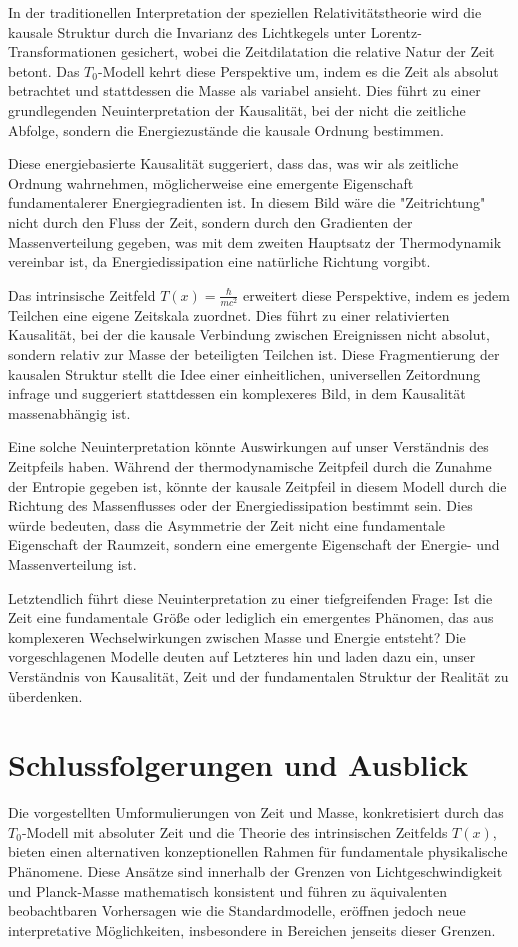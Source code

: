 \documentclass[a4paper,12pt]{article}
\newcommand{\Tfield}{T(x)}
\begin{document}
	In der traditionellen Interpretation der speziellen Relativitätstheorie wird die kausale Struktur durch die Invarianz des Lichtkegels unter Lorentz-Transformationen gesichert, wobei die Zeitdilatation die relative Natur der Zeit betont. Das \( T_0 \)-Modell kehrt diese Perspektive um, indem es die Zeit als absolut betrachtet und stattdessen die Masse als variabel ansieht. Dies führt zu einer grundlegenden Neuinterpretation der Kausalität, bei der nicht die zeitliche Abfolge, sondern die Energiezustände die kausale Ordnung bestimmen.
	
	Diese energiebasierte Kausalität suggeriert, dass das, was wir als zeitliche Ordnung wahrnehmen, möglicherweise eine emergente Eigenschaft fundamentalerer Energiegradienten ist. In diesem Bild wäre die "Zeitrichtung" nicht durch den Fluss der Zeit, sondern durch den Gradienten der Massenverteilung gegeben, was mit dem zweiten Hauptsatz der Thermodynamik vereinbar ist, da Energiedissipation eine natürliche Richtung vorgibt.
	
	Das intrinsische Zeitfeld \(\Tfield = \frac{\hbar}{m c^2}\) erweitert diese Perspektive, indem es jedem Teilchen eine eigene Zeitskala zuordnet. Dies führt zu einer relativierten Kausalität, bei der die kausale Verbindung zwischen Ereignissen nicht absolut, sondern relativ zur Masse der beteiligten Teilchen ist. Diese Fragmentierung der kausalen Struktur stellt die Idee einer einheitlichen, universellen Zeitordnung infrage und suggeriert stattdessen ein komplexeres Bild, in dem Kausalität massenabhängig ist.
	
	Eine solche Neuinterpretation könnte Auswirkungen auf unser Verständnis des Zeitpfeils haben. Während der thermodynamische Zeitpfeil durch die Zunahme der Entropie gegeben ist, könnte der kausale Zeitpfeil in diesem Modell durch die Richtung des Massenflusses oder der Energiedissipation bestimmt sein. Dies würde bedeuten, dass die Asymmetrie der Zeit nicht eine fundamentale Eigenschaft der Raumzeit, sondern eine emergente Eigenschaft der Energie- und Massenverteilung ist.
	
	Letztendlich führt diese Neuinterpretation zu einer tiefgreifenden Frage: Ist die Zeit eine fundamentale Größe oder lediglich ein emergentes Phänomen, das aus komplexeren Wechselwirkungen zwischen Masse und Energie entsteht? Die vorgeschlagenen Modelle deuten auf Letzteres hin und laden dazu ein, unser Verständnis von Kausalität, Zeit und der fundamentalen Struktur der Realität zu überdenken.
	
	\section{Schlussfolgerungen und Ausblick}
	Die vorgestellten Umformulierungen von Zeit und Masse, konkretisiert durch das \( T_0 \)-Modell mit absoluter Zeit und die Theorie des intrinsischen Zeitfelds \(\Tfield\), bieten einen alternativen konzeptionellen Rahmen für fundamentale physikalische Phänomene. Diese Ansätze sind innerhalb der Grenzen von Lichtgeschwindigkeit und Planck-Masse mathematisch konsistent und führen zu äquivalenten beobachtbaren Vorhersagen wie die Standardmodelle, eröffnen jedoch neue interpretative Möglichkeiten, insbesondere in Bereichen jenseits dieser Grenzen.
	
\end{document}

